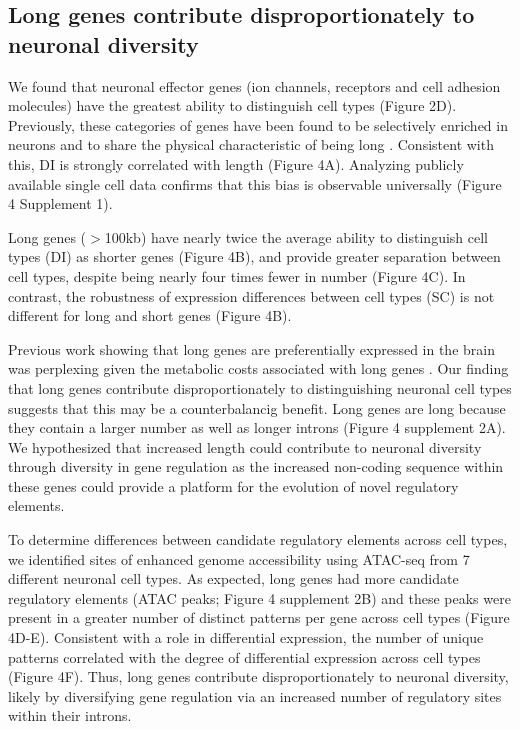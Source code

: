 \subsection{Long genes contribute disproportionately to neuronal diversity}

We found that neuronal effector genes (ion channels, receptors and cell adhesion molecules) have the greatest ability to distinguish cell types (Figure 2D). Previously, these categories of genes have been found to be selectively enriched in neurons and to share the physical characteristic of being long \citep{Sugino_2014,Gabel_2015,Zylka_2015}. Consistent with this, DI is strongly correlated with length (Figure 4A). Analyzing publicly available single cell data confirms that this bias is observable universally (Figure 4 Supplement 1). 

Long genes ($\gt$100kb) have nearly twice the average ability to distinguish cell types (DI) as shorter genes (Figure 4B), and provide greater separation between cell types, despite being nearly four times fewer in number (Figure 4C). In contrast, the robustness of expression differences between cell types (SC) is not different for long and short genes (Figure 4B). 

Previous work showing that long genes are preferentially expressed in the brain was perplexing given the metabolic costs associated with long genes \cite{Castillo_Davis_2002}. Our finding that long genes contribute disproportionately to distinguishing neuronal cell types suggests that this may be a counterbalancig benefit. Long genes are long because they contain a larger number as well as longer introns (Figure 4 supplement 2A). We hypothesized that increased length could contribute to neuronal diversity through diversity in gene regulation as the increased non-coding sequence within these genes could provide a platform for the evolution of novel regulatory elements.

To determine differences between candidate regulatory elements across cell types, we identified sites of enhanced genome accessibility using ATAC-seq \cite{Buenrostro_2013} from 7 different neuronal cell types. As expected, long genes had more candidate regulatory elements (ATAC peaks; Figure 4 supplement 2B) and these peaks were present in a greater number of distinct patterns per gene across cell types (Figure 4D-E). Consistent with a role in differential expression, the number of unique patterns correlated with the degree of differential expression across cell types (Figure 4F). Thus, long genes contribute disproportionately to neuronal diversity, likely by diversifying  gene regulation via an increased number of regulatory sites within their introns. 



